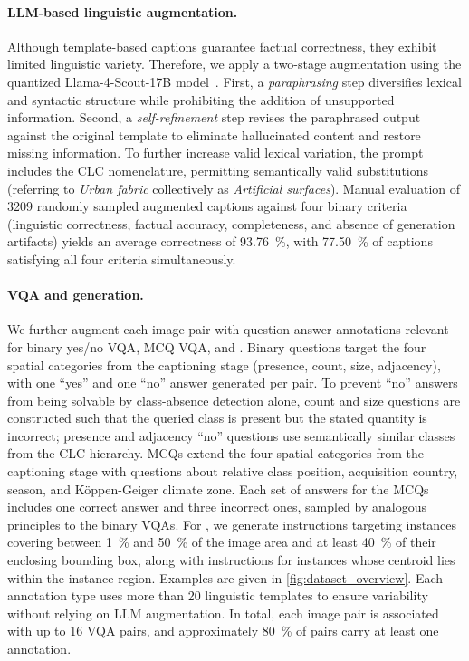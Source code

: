 \paragraph{LLM-based linguistic augmentation.} Although template-based captions guarantee factual correctness, they exhibit limited linguistic variety. 
Therefore, we apply a two-stage augmentation using the quantized Llama-4-Scout-17B model~\cite{touvron2023llamaopenefficientfoundation}.
First, a \textit{paraphrasing} step diversifies lexical and syntactic structure while prohibiting the addition of unsupported information.
Second, a \textit{self-refinement} step \cite{self-refinement} revises the paraphrased output against the original template to eliminate hallucinated content and restore missing information. 
To further increase valid lexical variation, the prompt includes the \ac{CLC} nomenclature, permitting semantically valid substitutions (\eg referring to \emph{Urban fabric} collectively as \emph{Artificial surfaces}). 
Manual evaluation of \num{3209} randomly sampled augmented captions against four binary criteria (linguistic correctness, factual accuracy, completeness, and absence of generation artifacts) yields an average correctness of \SI{93.76}{\percent}, with \SI{77.50}{\percent} of captions satisfying all four criteria simultaneously.

\paragraph{VQA and \genDet{} generation.} We further augment each image pair with question-answer annotations relevant for binary yes/no \ac{VQA}, \ac{MCQ} \ac{VQA}, and \genDet. 
Binary questions target the four spatial categories from the captioning stage (presence, count, size, adjacency), with one \enquote{yes} and one \enquote{no} answer generated per pair. 
To prevent \enquote{no} answers from being solvable by class-absence detection alone, count and size questions are constructed such that the queried class is present but the stated quantity is incorrect; presence and adjacency \enquote{no} questions use semantically similar classes from the \ac{CLC} hierarchy. 
\Acp{MCQ} extend the four spatial categories from the captioning stage with questions about relative class position, acquisition country, season, and Köppen-Geiger climate zone.
Each set of answers for the \acp{MCQ} includes one correct answer and three incorrect ones, sampled by analogous principles to the binary \acp{VQA}. 
For \genDet, we generate  instructions targeting instances covering between \SI{1}{\percent} and \SI{50}{\percent} of the image area and at least \SI{40}{\percent} of their enclosing bounding box, along with \pointDet{} instructions for instances whose centroid lies within the instance region. 
Examples are given in \cref{fig:dataset_overview}.
Each annotation type uses more than 20 linguistic templates to ensure variability without relying on \ac{LLM} augmentation. 
In total, each image pair is associated with up to 16 \ac{VQA} pairs, and approximately \SI{80}{\percent} of pairs carry at least one \genDet{} annotation.

